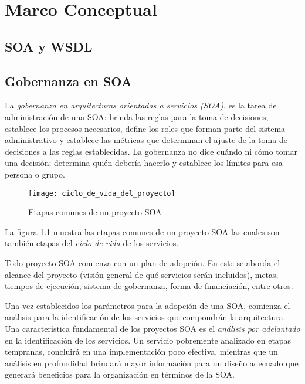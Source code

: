 \chapter{Marco Conceptual}
\label{MarcoConceptual}

\section{SOA y WSDL}
\label{MarcoConceptual:SOA_WSDL}

\section{Gobernanza en SOA}
  \label{MarcoConceptual:GobernanzaSOA}

  La \emph{gobernanza en arquitecturas orientadas a servicios (SOA)}, es la tarea de administración de una SOA: brinda las reglas para la toma de decisiones, establece los procesos necesarios, define los roles que forman parte del sistema administrativo y establece las métricas que determinan el ajuste de la toma de decisiones a las reglas establecidas. La gobernanza no dice cuándo ni cómo tomar una decisión; determina quién debería hacerlo y establece los límites para esa persona o grupo. \cite{Erl:2011:SGG:1983453}

  \begin{figure}[h]
    \centering
    \texttt{[image: ciclo\_de\_vida\_del\_proyecto]}
    \caption{Etapas comunes de un proyecto SOA}
    \label{figura:ciclo_de_vida_del_proyecto}
  \end{figure}

  La figura \ref{figura:ciclo_de_vida_del_proyecto} muestra las etapas comunes de un proyecto SOA las cuales son también etapas del \emph{ciclo de vida} de los servicios.

  Todo proyecto SOA comienza con un plan de adopción. En este se aborda el alcance del proyecto (visión general de qué servicios serán incluidos), metas, tiempos de ejecución, sistema de gobernanza, forma de financiación, entre otros.

  Una vez establecidos los parámetros para la adopción de una SOA, comienza el análisis para la identificación de los servicios que compondrán la arquitectura. Una característica fundamental de los proyectos SOA es el \emph{análisis por adelantado} en la identificación de los servicios. Un servicio pobremente analizado en etapas tempranas, concluirá en una implementación poco efectiva, mientras que un análisis en profundidad brindará mayor información para un diseño adecuado que generará beneficios para la organización en términos de la SOA.

